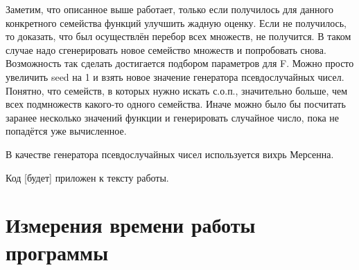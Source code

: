 \documentclass{article}
\begin{document}
    Заметим, что описанное выше работает, только если получилось для данного конкретного семейства функций улучшить жадную оценку. Если не получилось, то доказать, что был осуществлён перебор всех множеств, не получится. В таком случае надо сгенерировать новое семейство множеств и попробовать снова. Возможность так сделать достигается подбором параметров для F. Можно просто увеличить seed на 1 и взять новое значение генератора псевдослучайных чисел. Понятно, что семейств, в которых нужно искать с.о.п., значительно больше, чем всех подмножеств какого-то одного семейства. Иначе можно было бы посчитать заранее несколько значений функции и генерировать случайное число, пока не попадётся уже вычисленное.

    В качестве генератора псевдослучайных чисел используется вихрь Мерсенна. 

    Код [будет] приложен к тексту работы.

\section{Измерения времени работы программы}
    
\end{document}
